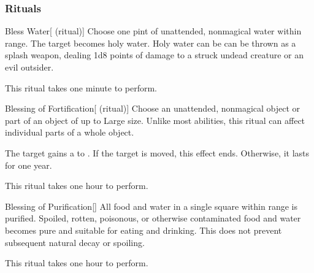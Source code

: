 \subsubsection{Rituals}


\lowercase{\hypertarget{spell:Bless Water}{}}\label{spell:Bless Water}
\begin{attuneability}[\nth{1}]{\hypertarget{spell:Bless Water}{Bless Water}}[ (ritual)]
Choose one pint of unattended, nonmagical water within \rngclose range.
The target becomes holy water.
Holy water can be can be thrown as a splash weapon, dealing 1d8 points of damage to a struck undead creature or an evil outsider.

This ritual takes one minute to perform.
\end{attuneability}
\vspace{0.25em}



\lowercase{\hypertarget{spell:Blessing of Fortification}{}}\label{spell:Blessing of Fortification}
\begin{attuneability}[\nth{1}]{\hypertarget{spell:Blessing of Fortification}{Blessing of Fortification}}[ (ritual)]
Choose an unattended, nonmagical object or part of an object of up to Large size.
Unlike most abilities, this ritual can affect individual parts of a whole object.

The target gains a   to .
If the target is moved, this effect ends.
Otherwise, it lasts for one year.

This ritual takes one hour to perform.
\end{attuneability}
\vspace{0.25em}



\lowercase{\hypertarget{spell:Blessing of Purification}{}}\label{spell:Blessing of Purification}
\begin{freeability}[\nth{1}]{\hypertarget{spell:Blessing of Purification}{Blessing of Purification}}[]
All food and water in a single square within \rngclose range is purified.
Spoiled, rotten, poisonous, or otherwise contaminated food and water becomes pure and suitable for eating and drinking.
This does not prevent subsequent natural decay or spoiling.

This ritual takes one hour to perform.
\end{freeability}
\vspace{0.25em}




